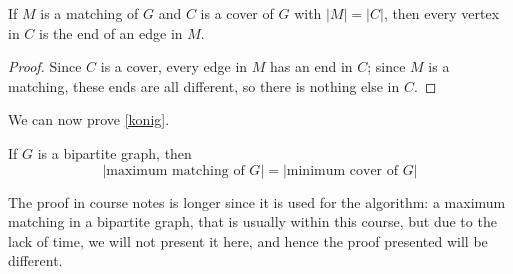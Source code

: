 \begin{thmbox}
    \begin{prop}\label{equality matching}
        If $ M $ is a matching of $ G $ and $ C $ is a cover of $ G $ with $ |M|=|C| $,
        then every vertex in $ C $ is the end of an edge in $ M $.
    \end{prop}
\end{thmbox}
\begin{proof}
    Since $ C $ is a cover, every edge in $ M $ has an end in $ C $; since $ M $
    is a matching, these ends are all different, so there is nothing else in $ C $.
\end{proof}
We can now prove \ref{konig}.
\begin{thmbox}
    \begin{theorem}
        If $ G $ is a bipartite graph, then
        \[ |\text{maximum matching of }G|=|\text{minimum cover of }G| \]
    \end{theorem}
\end{thmbox}
The proof in course notes is longer since it is used for the algorithm:
a maximum matching in a bipartite graph, that is usually within this course,
but due to the lack of time, we will not present it here, and hence the proof presented
will be different.
